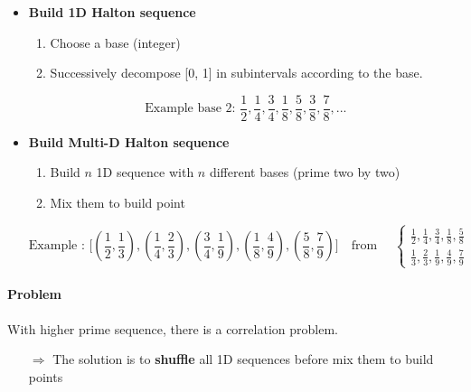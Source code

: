 \begin{itemize}
    \item \textbf{Build 1D Halton sequence}
        \begin{enumerate}
            \item Choose a base (integer) 
            \item Successively decompose [0, 1]
                in subintervals according to the base.
        \end{enumerate}

        $$\textrm{Example base 2: } \frac{1}{2},
        \frac{1}{4},\frac{3}{4}, \frac{1}{8}, \frac{5}{8},
        \frac{3}{8}, \frac{7}{8}, ...$$

    \item \textbf{Build Multi-D Halton sequence}
        \begin{enumerate}
            \item Build $n$ 1D sequence with $n$ different bases (prime
                two by two)
            \item Mix them to build point
        \end{enumerate}


        $$\textrm{Example : } \Bigg[(\frac{1}{2}, \frac{1}{3}),
            (\frac{1}{4}, \frac{2}{3}), (\frac{3}{4}, \frac{1}{9}), (\frac{1}{8},
        \frac{4}{9}),(\frac{5}{8}, \frac{7}{9})\Bigg]    \quad
        \textrm{from } \quad
        \begin{cases}
            \frac{1}{2}, \frac{1}{4},\frac{3}{4}, \frac{1}{8}, \frac{5}{8}\\
            \frac{1}{3}, \frac{2}{3},\frac{1}{9}, \frac{4}{9}, \frac{7}{9}
        \end{cases}$$

\end{itemize}


\paragraph{Problem} With higher prime sequence, there is a correlation
problem.

\begin{itemize}
    \item[$\Rightarrow$] The solution is to \textbf{shuffle} all 1D sequences before
        mix them to build points 
\end{itemize}

